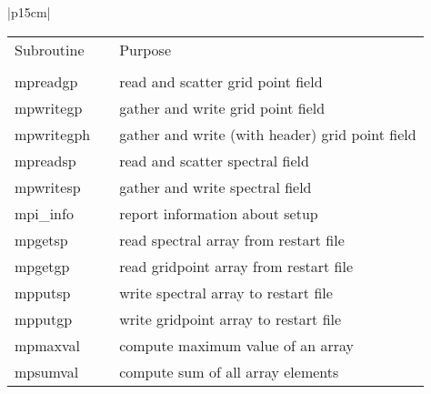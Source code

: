 \begin{center}
\begin{tabular}{|p{15cm}|}
\hline
\begin{center}
\begin{tabular}{l p{2cm} l}
Subroutine & &Purpose \\
&& \\
{\sub mpreadgp}& & read and scatter grid point field \\
{\sub mpwritegp}& & gather and write grid point field \\
{\sub mpwritegph} && gather and write (with header) grid point field \\
{\sub mpreadsp} & &read and scatter spectral field \\
{\sub mpwritesp} &&gather and write spectral field \\
{\sub mpi\_info} && report information about setup \\
{\sub mpgetsp}   && read spectral array from restart file \\
{\sub mpgetgp}   && read gridpoint array from restart file \\
{\sub mpputsp}   && write spectral array to restart file \\
{\sub mpputgp}   && write gridpoint array to restart file \\
{\sub mpmaxval}  && compute maximum value of an array \\
{\sub mpsumval}  && compute sum of all array elements \\
\end{tabular}
\end{center}

\vspace{3mm} \\

\hline
\end{tabular}
\end{center}
\newpage

